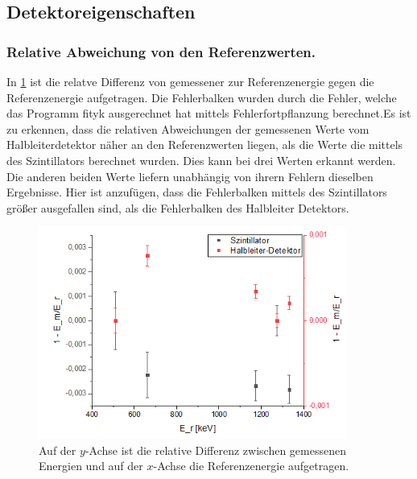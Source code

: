 \subsection{Detektoreigenschaften}
\subsubsection{ Relative Abweichung von den Referenzwerten.}
In \cref{ee} ist die relatve Differenz von gemessener zur Referenzenergie gegen die Referenzenergie aufgetragen. Die Fehlerbalken wurden durch die Fehler, welche das Programm fityk ausgerechnet hat mittels Fehlerfortpflanzung berechnet.Es ist zu erkennen, dass die relativen Abweichungen der gemessenen Werte vom Halbleiterdetektor näher an den Referenzwerten liegen, als die Werte die mittels des Szintillators berechnet wurden. Dies kann bei drei Werten erkannt werden. Die anderen beiden Werte liefern unabhängig von ihrern Fehlern dieselben Ergebnisse. Hier ist anzufügen, dass die Fehlerbalken mittels des Szintillators größer ausgefallen sind, als die Fehlerbalken des Halbleiter Detektors.
\begin{figure}[h!]
	\centering
	\includegraphics[width=0.9\textwidth]{1minEdurchE.png}
	\caption{Auf der $y$-Achse ist die relative Differenz zwischen gemessenen Energien und auf der $x$-Achse die Referenzenergie aufgetragen.}
	\label{ee}
\end{figure}
